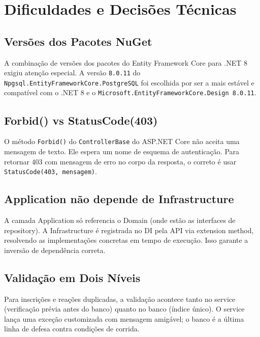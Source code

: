 \documentclass[11pt, a4paper, oneside]{article}
\begin{document}
\section{Dificuldades e Decisões Técnicas}

\subsection{Versões dos Pacotes NuGet}

A combinação de versões dos pacotes do Entity Framework Core para .NET 8 exigiu atenção especial. A versão \texttt{8.0.11} do \texttt{Npgsql.EntityFrameworkCore.PostgreSQL} foi escolhida por ser a mais estável e compatível com o .NET 8 e o \texttt{Microsoft.EntityFrameworkCore.Design 8.0.11}.

\subsection{Forbid() vs StatusCode(403)}

O método \texttt{Forbid()} do \texttt{ControllerBase} do ASP.NET Core não aceita uma mensagem de texto. Ele espera um nome de esquema de autenticação. Para retornar 403 com mensagem de erro no corpo da resposta, o correto é usar \texttt{StatusCode(403, mensagem)}.

\subsection{Application não depende de Infrastructure}

A camada Application só referencia o Domain (onde estão as interfaces de repository). A Infrastructure é registrada no DI pela API via extension method, resolvendo as implementações concretas em tempo de execução. Isso garante a inversão de dependência correta.

\subsection{Validação em Dois Níveis}

Para inscrições e reações duplicadas, a validação acontece tanto no service (verificação prévia antes do banco) quanto no banco (índice único). O service lança uma exceção customizada com mensagem amigável; o banco é a última linha de defesa contra condições de corrida.

\end{document}
